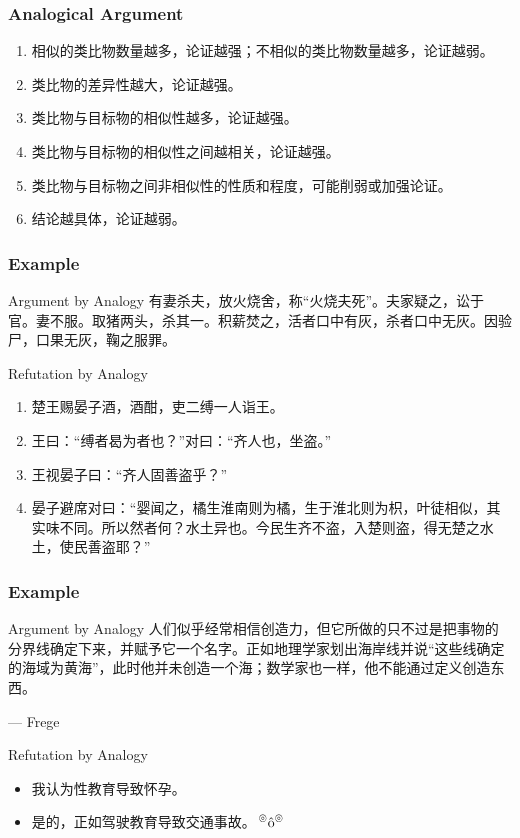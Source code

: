 \documentclass[UTF8,11pt,colorlinks,compress,openany]{beamer}%
\begin{document}
\begin{frame}\frametitle{Analogical Argument}
	\begin{prooftree}
		\noLine
		\alwaysSingleLine
	\end{prooftree}
	\begin{enumerate}
		\item 相似的类比物数量越多，论证越强；不相似的类比物数量越多，论证越弱。
		\item 类比物的差异性越大，论证越强。
		\item 类比物与目标物的相似性越多，论证越强。
		\item 类比物与目标物的相似性之间越相关，论证越强。
		\item 类比物与目标物之间非相似性的性质和程度，可能削弱或加强论证。
		\item 结论越具体，论证越弱。
	\end{enumerate}
\end{frame}

\begin{frame}\frametitle{Example}
\begin{block}{Argument by Analogy}
	有妻杀夫，放火烧舍，称“火烧夫死”。夫家疑之，讼于官。妻不服。取猪两头，杀其一。积薪焚之，活者口中有灰，杀者口中无灰。因验尸，口果无灰，鞠之服罪。
\end{block}
\begin{block}{Refutation by Analogy}
\begin{enumerate}
	\item 楚王赐晏子酒，酒酣，吏二缚一人诣王。
	\item 王曰：“缚者曷为者也？”对曰：“齐人也，坐盗。”
	\item 王视晏子曰：“齐人固善盗乎？”
	\item 晏子避席对曰：“婴闻之，橘生淮南则为橘，生于淮北则为枳，叶徒相似，其实味不同。所以然者何？水土异也。今民生齐不盗，入楚则盗，得无楚之水土，使民善盗耶？”
\end{enumerate}
\end{block}
\end{frame}

\begin{frame}\frametitle{Example}
	\begin{block}{Argument by Analogy}
		人们似乎经常相信创造力，但它所做的只不过是把事物的分界线确定下来，并赋予它一个名字。正如地理学家划出海岸线并说“这些线确定的海域为黄海”，此时他并未创造一个海；数学家也一样，他不能通过定义创造东西。\par \hfill --- Frege
	\end{block}
	\begin{block}{Refutation by Analogy}
		\begin{itemize}
			\item 我认为性教育导致怀孕。
			\item 是的，正如驾驶教育导致交通事故。\textcolor{red}{$\sideset{^\circledcirc}{^\circledcirc}{\operatorname{\hat{o}}}$}
		\end{itemize}
	\end{block}
\end{frame}
\end{document}
